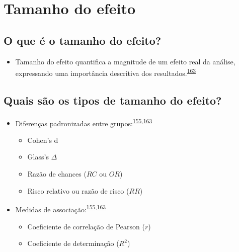 \documentclass[
  a4paper,
]{book}
\providecommand{\tightlist}{%
  \setlength{\itemsep}{0pt}\setlength{\parskip}{0pt}}
\begin{document}
\hypertarget{tamanho-efeito}{%
\section{Tamanho do efeito}\label{tamanho-efeito}}

\hypertarget{o-que-uxe9-o-tamanho-do-efeito}{%
\subsection{O que é o tamanho do efeito?}\label{o-que-uxe9-o-tamanho-do-efeito}}

\begin{itemize}
\tightlist
\item
  Tamanho do efeito quantifica a magnitude de um efeito real da análise, expressando uma importância descritiva dos resultados.\textsuperscript{\protect\hyperlink{ref-Kim2015}{163}}
\end{itemize}

\hypertarget{quais-suxe3o-os-tipos-de-tamanho-do-efeito}{%
\subsection{Quais são os tipos de tamanho do efeito?}\label{quais-suxe3o-os-tipos-de-tamanho-do-efeito}}

\begin{itemize}
\item
  Diferenças padronizadas entre grupos:\textsuperscript{\protect\hyperlink{ref-Sullivan2012}{155},\protect\hyperlink{ref-Kim2015}{163}}

  \begin{itemize}
  \item
    Cohen's d
  \item
    Glass's \(\Delta\)
  \item
    Razão de chances (\(RC\) ou \(OR\))
  \item
    Risco relativo ou razão de risco (\(RR\))
  \end{itemize}
\item
  Medidas de associação:\textsuperscript{\protect\hyperlink{ref-Sullivan2012}{155},\protect\hyperlink{ref-Kim2015}{163}}

  \begin{itemize}
  \item
    Coeficiente de correlação de Pearson (\(r\))
  \item
    Coeficiente de determinação (\(R^2\))
  \end{itemize}
\end{itemize}
\end{document}
